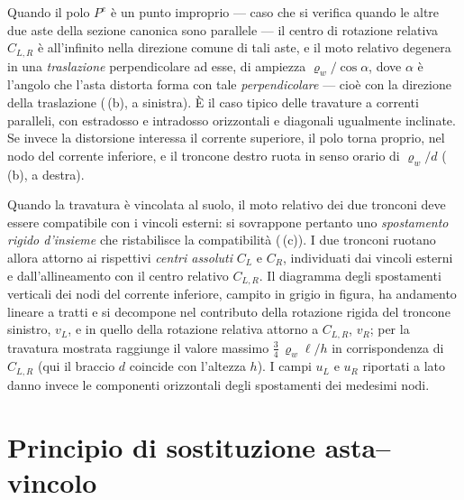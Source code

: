 




Quando il polo $P^e$ è un punto improprio --- caso che si verifica
quando le altre due aste della sezione canonica sono parallele --- il
centro di rotazione relativa $C_{L,R}$ è all'infinito nella direzione
comune di tali aste, e il moto relativo degenera in una
\emph{traslazione} perpendicolare ad esse, di ampiezza
$\varrho_w/\cos\alpha$, dove $\alpha$ è l'angolo che l'asta distorta
forma con tale \emph{perpendicolare} --- cioè con la direzione della
traslazione (\,(b), a sinistra). È il caso tipico delle
travature a correnti paralleli, con estradosso e intradosso orizzontali
e diagonali ugualmente inclinate. Se invece la distorsione interessa il
corrente superiore, il polo torna proprio, nel nodo del corrente
inferiore, e il troncone destro ruota in senso orario di $\varrho_w/d$
(\,(b), a destra).

Quando la travatura è vincolata al suolo, il moto relativo dei due
tronconi deve essere compatibile con i vincoli esterni: si sovrappone
pertanto uno \emph{spostamento rigido d'insieme} che ristabilisce la
compatibilità (\,(c)). I due tronconi ruotano
allora attorno ai rispettivi \emph{centri assoluti} $C_L$ e $C_R$,
individuati dai vincoli esterni e dall'allineamento con il centro
relativo $C_{L,R}$. Il diagramma degli spostamenti verticali dei nodi
del corrente inferiore, campito in grigio in figura, ha andamento
lineare a tratti e si decompone nel contributo della rotazione rigida
del troncone sinistro, $v_L$, e in quello della rotazione relativa
attorno a $C_{L,R}$, $v_R$; per la travatura mostrata raggiunge il
valore massimo $\tfrac{3}{4}\,\varrho_w\ell/h$ in corrispondenza di
$C_{L,R}$ (qui il braccio $d$ coincide con l'altezza $h$). I campi
$u_L$ e  $u_R$ riportati a lato danno invece le componenti orizzontali degli spostamenti dei medesimi nodi.






\section{Principio di sostituzione asta--vincolo}
\label{sec:sostituzione_reticolari}

